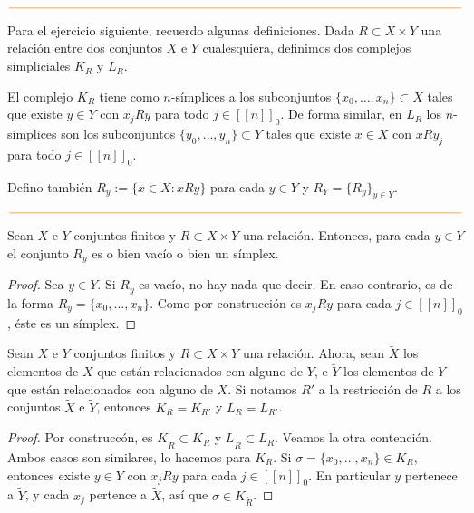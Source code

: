 \documentclass[11pt]{article}
\newcommand{\nat}[1]{[\![#1]\!]}
\newcommand{\natzero}[1]{\nat{#1}_0}
\newcommand{\paint}[1]{\color{color}{#1}}
\newenvironment{lemma}[2][Lema]{\begin{trivlist}
\item[\hskip \labelsep \paint{{\bfseries #1}}\hskip \labelsep {\bfseries #2.}]}{\end{trivlist}}
\begin{document}
\begin{center}
$\paint{
\rule{400pt}{0.5pt}
}$
\vspace{5pt}
\end{center}

Para el ejercicio siguiente, recuerdo algunas definiciones. Dada $R \subset X \times Y$ una relaci\'on entre dos conjuntos $X$ e $Y$ cualesquiera, definimos dos complejos simpliciales $K_R$ y $L_R$. 

El complejo $K_R$ tiene como $n$-s\'implices a los subconjuntos $\{x_0, \dots, x_n\} \subset X$ tales que existe $y \in Y$ con $x_jRy$ para todo $j \in \natzero{n}$. De forma similar, en $L_R$ los $n$-s\'implices son los subconjuntos $\{y_0, \dots, y_n\} \subset Y$ tales que existe $x \in X$ con $xRy_j$ para todo $j \in \natzero{n}$.

Defino tambi\'en $R_y := \{x \in X : xRy\}$ para cada $y \in Y$ y $R_Y = \{R_y\}_{y \in Y}$.
\begin{center}
$\paint{
\rule{400pt}{0.5pt}
}$
\vspace{15pt}
\end{center}

\begin{lemma}{5} Sean $X$ e $Y$ conjuntos finitos y $R \subset X \times Y$ una relaci\'on. Entonces, para cada $y \in Y$ el conjunto $R_y$ es o bien vac\'io o bien un s\'implex.
\end{lemma}
\begin{proof} Sea $y \in Y$. Si $R_y$ es vac\'io, no hay nada que decir. En caso contrario, es de la forma $R_y = \{x_0, \dots, x_n\}$. Como por construcci\'on  es $x_jRy$ para cada $j \in \natzero{n}$, \'este es un s\'implex. 
\end{proof}

\begin{lemma}{6} Sean $X$ e $Y$ conjuntos finitos y $R \subset X \times Y$ una relaci\'on. Ahora, sean $\tilde{X}$ los elementos de $X$ que est\'an relacionados con alguno de $Y$, e $\tilde{Y}$ los elementos de $Y$ que est\'an relacionados con alguno de $X$. Si notamos $R'$ a la restricci\'on de $R$ a los conjuntos $\tilde{X}$ e $\tilde{Y}$, entonces $K_R = K_{R'}$ y $L_R = L_{R'}$.
\end{lemma}
\begin{proof} Por construcc\'on, es $K_{\tilde{R}} \subset K_R$ y $L_{\tilde{R}} \subset L_R$. Veamos la otra contenci\'on. Ambos casos son similares, lo hacemos para $K_R$. Si $\sigma = \{x_0, \dots, x_n\} \in K_R$, entonces existe $y \in Y$ con $x_jRy$ para cada $j \in \natzero{n}$. En particular $y$ pertenece a $\tilde{Y}$, y cada $x_j$ pertence a $\tilde{X}$, as\'i que $\sigma \in K_{\tilde{R}}$.
\end{proof}
\end{document}
